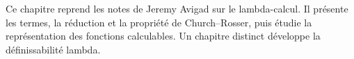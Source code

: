 \documentclass[../../../include/open-logic-chapter]{subfiles}
\begin{document}

Ce chapitre reprend les notes de Jeremy Avigad sur le lambda-calcul.
Il présente les termes, la réduction et la propriété de
Church--Rosser, puis étudie la représentation des fonctions
calculables. Un chapitre distinct développe la définissabilité
lambda.














\OLEndChapterHook
\end{document}
